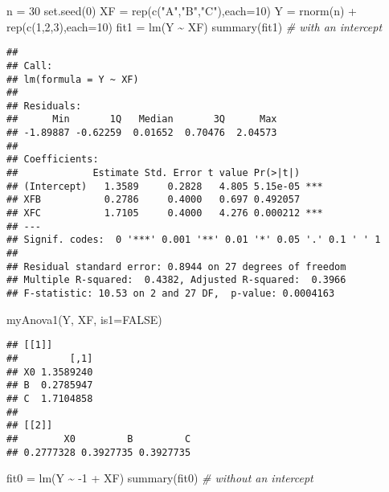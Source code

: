 \documentclass[
  11pt,
]{article}
\newenvironment{Shaded}{\begin{snugshade}}{\end{snugshade}}
\newcommand{\AttributeTok}[1]{\textcolor[rgb]{0.77,0.63,0.00}{#1}}
\newcommand{\CommentTok}[1]{\textcolor[rgb]{0.56,0.35,0.01}{\textit{#1}}}
\newcommand{\ConstantTok}[1]{\textcolor[rgb]{0.00,0.00,0.00}{#1}}
\newcommand{\DecValTok}[1]{\textcolor[rgb]{0.00,0.00,0.81}{#1}}
\newcommand{\FunctionTok}[1]{\textcolor[rgb]{0.00,0.00,0.00}{#1}}
\newcommand{\NormalTok}[1]{#1}
\newcommand{\OtherTok}[1]{\textcolor[rgb]{0.56,0.35,0.01}{#1}}
\newcommand{\SpecialCharTok}[1]{\textcolor[rgb]{0.00,0.00,0.00}{#1}}
\newcommand{\StringTok}[1]{\textcolor[rgb]{0.31,0.60,0.02}{#1}}
\begin{document}
\begin{Shaded}
\begin{Highlighting}[]
\NormalTok{n }\OtherTok{=} \DecValTok{30}
\FunctionTok{set.seed}\NormalTok{(}\DecValTok{0}\NormalTok{)}
\NormalTok{XF }\OtherTok{=} \FunctionTok{rep}\NormalTok{(}\FunctionTok{c}\NormalTok{(}\StringTok{"A"}\NormalTok{,}\StringTok{"B"}\NormalTok{,}\StringTok{"C"}\NormalTok{),}\AttributeTok{each=}\DecValTok{10}\NormalTok{)}
\NormalTok{Y }\OtherTok{=} \FunctionTok{rnorm}\NormalTok{(n) }\SpecialCharTok{+} \FunctionTok{rep}\NormalTok{(}\FunctionTok{c}\NormalTok{(}\DecValTok{1}\NormalTok{,}\DecValTok{2}\NormalTok{,}\DecValTok{3}\NormalTok{),}\AttributeTok{each=}\DecValTok{10}\NormalTok{)}
\NormalTok{fit1 }\OtherTok{=} \FunctionTok{lm}\NormalTok{(Y }\SpecialCharTok{\textasciitilde{}}\NormalTok{ XF)}
\FunctionTok{summary}\NormalTok{(fit1) }\CommentTok{\# with an intercept}
\end{Highlighting}
\end{Shaded}

\begin{verbatim}
## 
## Call:
## lm(formula = Y ~ XF)
## 
## Residuals:
##      Min       1Q   Median       3Q      Max 
## -1.89887 -0.62259  0.01652  0.70476  2.04573 
## 
## Coefficients:
##             Estimate Std. Error t value Pr(>|t|)    
## (Intercept)   1.3589     0.2828   4.805 5.15e-05 ***
## XFB           0.2786     0.4000   0.697 0.492057    
## XFC           1.7105     0.4000   4.276 0.000212 ***
## ---
## Signif. codes:  0 '***' 0.001 '**' 0.01 '*' 0.05 '.' 0.1 ' ' 1
## 
## Residual standard error: 0.8944 on 27 degrees of freedom
## Multiple R-squared:  0.4382, Adjusted R-squared:  0.3966 
## F-statistic: 10.53 on 2 and 27 DF,  p-value: 0.0004163
\end{verbatim}

\begin{Shaded}
\begin{Highlighting}[]
\FunctionTok{myAnova1}\NormalTok{(Y, XF, }\AttributeTok{is1=}\ConstantTok{FALSE}\NormalTok{)}
\end{Highlighting}
\end{Shaded}

\begin{verbatim}
## [[1]]
##         [,1]
## X0 1.3589240
## B  0.2785947
## C  1.7104858
## 
## [[2]]
##        X0         B         C 
## 0.2777328 0.3927735 0.3927735
\end{verbatim}

\begin{Shaded}
\begin{Highlighting}[]
\NormalTok{fit0 }\OtherTok{=} \FunctionTok{lm}\NormalTok{(Y }\SpecialCharTok{\textasciitilde{}} \SpecialCharTok{{-}}\DecValTok{1} \SpecialCharTok{+}\NormalTok{ XF)}
\FunctionTok{summary}\NormalTok{(fit0) }\CommentTok{\# without an intercept}
\end{Highlighting}
\end{Shaded}
\end{document}
